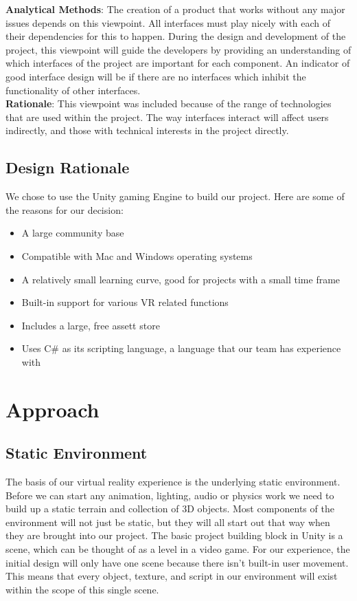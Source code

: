 \documentclass[10pt,journal,compsoc,onecolumn, draftclsnofoot]{IEEEtran}
\begin{document}
\hangindent=0.5cm \textbf{Analytical Methods}: The creation of a product that works without any major issues depends on this viewpoint.
All interfaces must play nicely with each of their dependencies for this to happen.
During the design and development of the project, this viewpoint will guide the developers by providing an understanding of which interfaces of the project are important for each component.
An indicator of good interface design will be if there are no interfaces which inhibit the functionality of other interfaces.\\

\hangindent=0.5cm \textbf{Rationale}: This viewpoint was included because of the range of technologies that are used within the project.
The way interfaces interact will affect users indirectly, and those with technical interests in the project directly.

\subsection{Design Rationale}
We chose to use the Unity gaming Engine to build our project. Here are some of the reasons for our decision:
\begin{itemize}
  \item A large community base
  \item Compatible with Mac and Windows operating systems
  \item A relatively small learning curve, good for projects with a small time frame
  \item Built-in support for various VR related functions
  \item Includes a large, free assett store
  \item Uses C\# as its scripting language, a language that our team has experience with
\end{itemize}

\section{Approach}
\subsection{Static Environment}
The basis of our virtual reality experience is the underlying static
environment. Before we can start any animation, lighting, audio or physics
work we need to build up a static terrain and collection of 3D objects.
Most components of the environment will not just be static, but they will all
start out that way when they are brought into our project. The basic project
building block in Unity is a scene, which can be thought of as a level in a
video game. \cite{microsoft_mag} For our experience, the initial design will
only have one scene because there isn't built-in user movement. This means that
every object, texture, and script in our environment will exist within the
scope of this single scene.
\end{document}
